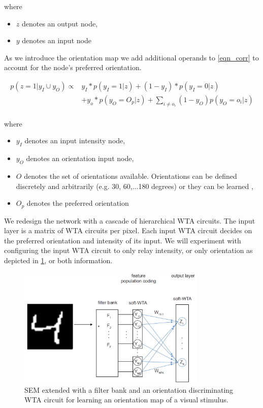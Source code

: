 \documentclass{report}
\begin{document}
where
\begin{itemize}
  \item $z$ denotes an output node,
  \item $y$ denotes an input node
\end{itemize}

As we introduce the orientation map we add additional operands to \ref{eqn_corr} to account for the node's preferred orientation.

\begin{equation}
	\begin{split}
		p(z=1|y_I \cup y_O) \propto &y_I*p(y_I=1|z) + (1-y_I)*p(y_I=0|z) \\
			&+ y_o*p(y_O=O_p|z)+\sum_{i\neq o_i} (1-y_O)p(y_O=o_i|z)\\
	\end{split}
	\label{eqn_corr2}
\end{equation}

where
\begin{itemize}
  \item $y_I$ denotes an input intensity node,
  \item $y_O$ denotes an orientation input node,
  \item $O$ denotes the set of orientations available. Orientations can be defined discretely and arbitrarily (e.g. 30, 60,...180 degrees) or they can be learned \cite{Nessler2010},
  \item $O_p$ denotes the preferred orientation
\end{itemize}

We redesign the network with a cascade of hierarchical WTA circuits. The input layer is a matrix of WTA circuits per pixel. Each input WTA circuit decides on the preferred orientation and intensity of its input. We will experiment with configuring the input WTA circuit to only relay intensity, or only orientation as depicted in \cref{fig:network_learn_orientations}, or both information.

\begin{figure}[ht]
\centering
\includegraphics[width=0.8\textwidth]{network_learn_orientations}
\caption{SEM extended with a filter bank and an orientation discriminating WTA circuit for learning an orientation map of a visual stimulus. \label{fig:network_learn_orientations}}
\end{figure}
\end{document}
